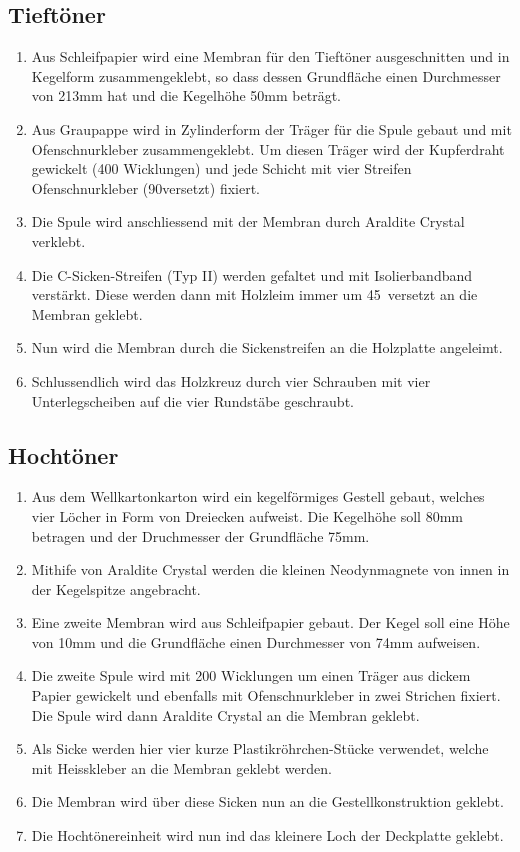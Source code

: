 \documentclass[a4paper,11pt]{report}
\begin{document}
\subsection{Tieftöner}
\begin{enumerate}
    \item Aus Schleifpapier wird eine Membran für den Tieftöner ausgeschnitten und in Kegelform zusammengeklebt, so dass dessen Grundfläche einen Durchmesser von 213mm hat und die Kegelhöhe 50mm beträgt.
    \item Aus Graupappe wird in Zylinderform der Träger für die Spule gebaut und mit Ofenschnurkleber zusammengeklebt. Um diesen Träger wird der Kupferdraht gewickelt (400 Wicklungen) und jede Schicht mit vier Streifen Ofenschnurkleber (90\textdegree versetzt) fixiert. 
    \item Die Spule wird anschliessend mit der Membran durch Araldite Crystal verklebt.
    \item Die C-Sicken-Streifen (Typ II) werden gefaltet und mit Isolierbandband verstärkt. Diese werden dann mit Holzleim immer um 45\textdegree\ versetzt an die Membran geklebt.
    \item Nun wird die Membran durch die Sickenstreifen an die Holzplatte angeleimt.
    \item Schlussendlich wird das Holzkreuz durch vier Schrauben mit vier Unterlegscheiben auf die vier Rundstäbe geschraubt.
\end{enumerate}
\subsection{Hochtöner}
\begin{enumerate}
    \item Aus dem Wellkartonkarton wird ein kegelförmiges Gestell gebaut, welches vier Löcher in Form von Dreiecken aufweist. Die Kegelhöhe soll 80mm betragen und der Druchmesser der Grundfläche 75mm.
    \item Mithife von Araldite Crystal werden die kleinen Neodynmagnete von innen in der Kegelspitze angebracht.
    \item Eine zweite Membran wird aus Schleifpapier gebaut. Der Kegel soll eine Höhe von 10mm und die Grundfläche einen Durchmesser von 74mm aufweisen.
    \item Die zweite Spule wird mit 200 Wicklungen um einen Träger aus dickem Papier gewickelt und ebenfalls mit Ofenschnurkleber in zwei Strichen fixiert. Die Spule wird dann  Araldite Crystal an die Membran geklebt.
    \item Als Sicke werden hier vier kurze Plastikröhrchen-Stücke verwendet, welche mit Heisskleber an die Membran geklebt werden.
    \item Die Membran wird über diese Sicken nun an die Gestellkonstruktion geklebt.
    \item Die Hochtönereinheit wird nun ind das kleinere Loch der Deckplatte geklebt.
\end{enumerate}
\end{document}
